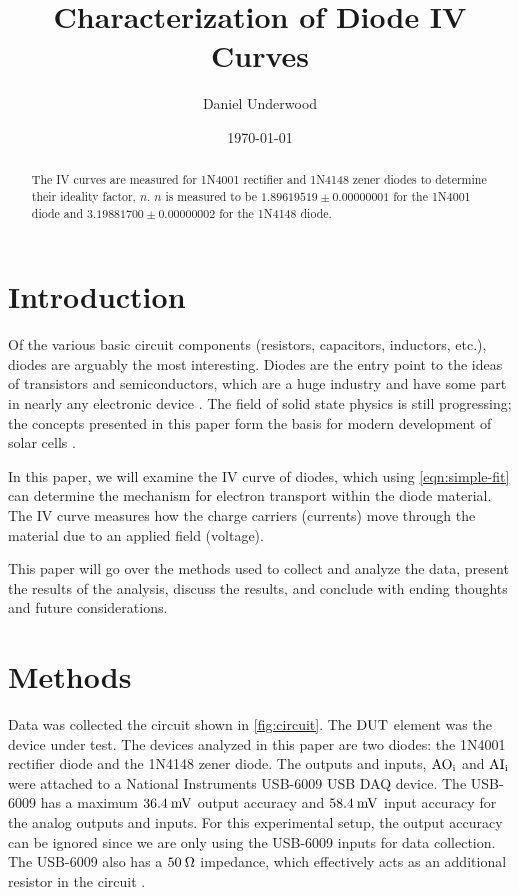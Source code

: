 \documentclass[reprint]{revtex4-1}
\begin{document}
\title{Characterization of Diode IV Curves}
\author{Daniel Underwood}
\date{\today}

\begin{abstract}

The IV curves are measured for \textsc{1N4001} rectifier and \textsc{1N4148} zener diodes to determine their ideality factor, $n$. $n$ is measured to be $1.89619519 \pm 0.00000001$ for the \textsc{1N4001} diode and $3.19881700 \pm 0.00000002$ for the \textsc{1N4148} diode.

\end{abstract}
\maketitle

\section{Introduction}

Of the various basic circuit components (resistors, capacitors, inductors, etc.), diodes are arguably the most interesting. Diodes are the entry point to the ideas of transistors and semiconductors, which are a huge industry and have some part in nearly any electronic device \cite{Ross1998}. The field of solid state physics is still progressing; the concepts presented in this paper form the basis for modern development of solar cells \cite{Deibel2010,Jain2005}.

In this paper, we will examine the IV curve of diodes, which using \cref{eqn:simple-fit} can determine the mechanism for electron transport within the diode material. The IV curve measures how the charge carriers (currents) move through the material due to an applied field (voltage).

This paper will go over the methods used to collect and analyze the data, present the results of the analysis, discuss the results, and conclude with ending thoughts and future considerations.

\section{Methods}

Data was collected the circuit shown in \cref{fig:circuit}. The $\rm{DUT}$ element was the device under test. The devices analyzed in this paper are two diodes: the \textsc{1N4001} rectifier diode and the \textsc{1N4148} zener diode. The outputs and inputs, $\rm{AO}_i$ and $\rm{AI}_i$ were attached to a National Instruments USB-6009 USB DAQ device. The USB-6009 has a maximum $36.4\:\rm{mV}$ output accuracy and $58.4\:\rm{mV}$ input accuracy for the analog outputs and inputs. For this experimental setup, the output accuracy can be ignored since we are only using the USB-6009 inputs for data collection. The USB-6009 also has a $50\:\rm{\Omega}$ impedance, which effectively acts as an additional resistor in the circuit \cite{Instruments2014}. 
\end{document}
